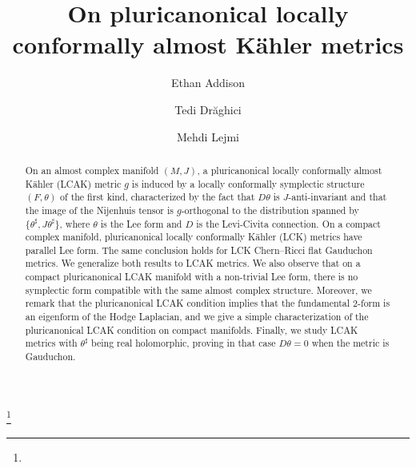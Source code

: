\documentclass[a4paper,11pt]{amsart}
\theoremstyle{definition}
\renewcommand{\[}{\begin{equation*}}
\renewcommand{\]}{\end{equation*}}
\begin{document}
\parskip 1mm

\title[Pluricanonical LCAK metrics]{On pluricanonical locally conformally almost K\"ahler metrics}

\author{Ethan Addison}
\address{Department of Mathematics, Texas State University, San Marcos, TX 78666-4684, USA}

\author{Tedi Dr\u{a}ghici} 
\address{Department of Mathematics and Statistics, Florida International University, Miami, FL 33199, USA}

\author{Mehdi Lejmi}
\address{Department of Mathematics, Bronx Community College of CUNY, Bronx, NY 10453, USA.}



\thanks{ }


\keywords{}


\maketitle
\begin{abstract}
On an almost complex manifold $(M,J)$, a pluricanonical locally conformally almost K\"ahler (LCAK)  metric $g$ is induced by a locally conformally symplectic structure $(F,\theta)$ of the first kind, characterized by the fact that $D\theta$ is $J$-anti-invariant and that the image of the Nijenhuis tensor is $g$-orthogonal to the distribution spanned by $\{\theta^\sharp,J\theta^\sharp\}$, where $\theta$ is the Lee form and $D$ is the Levi-Civita connection. On a compact complex manifold, pluricanonical locally conformally K\"ahler (LCK) metrics have parallel Lee form. The same conclusion holds for LCK Chern--Ricci flat Gauduchon metrics. We generalize both results to LCAK metrics.
We also observe that on a compact pluricanonical LCAK manifold with a non-trivial Lee form, there is no symplectic form compatible with the same almost complex structure. Moreover, we remark that the pluricanonical LCAK condition implies that the fundamental $2$-form is an eigenform of the Hodge Laplacian, and we give a simple characterization of the pluricanonical LCAK condition on compact manifolds. Finally, we study LCAK metrics with $\theta^\sharp$ being real holomorphic, proving in that case $D\theta=0$ when the metric is Gauduchon.
\end{abstract}
  
\end{document}
